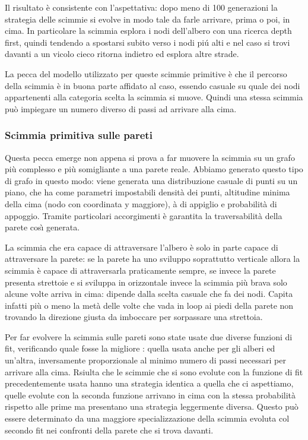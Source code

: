 \documentclass{article}
\begin{document}
Il risultato \`{e} consistente con l'aspettativa: dopo meno di 100 generazioni la strategia delle scimmie si evolve in modo tale da farle arrivare, prima o poi, in cima. In particolare la scimmia esplora i nodi dell'albero con una ricerca depth first, quindi tendendo a spostarsi subito verso i nodi pi\'{u} alti e nel caso si trovi davanti a un vicolo cieco ritorna indietro ed esplora altre strade.

La pecca del modello utilizzato per queste scimmie primitive \`{e} che il percorso della scimmia \`{e} in buona parte affidato al caso, essendo casuale su quale dei nodi appartenenti alla categoria scelta la scimmia si muove. Quindi una stessa scimmia pu\`{o} impiegare un numero diverso di passi ad arrivare alla cima.
\subsubsection{Scimmia primitiva sulle pareti}
Questa pecca emerge non appena si prova a far muovere la scimmia su un grafo pi\`{u} complesso e pi\`{u} somigliante a una parete reale. Abbiamo generato questo tipo di grafo in questo modo: viene generata una distribuzione casuale di punti su un piano, che ha come parametri impostabili densit\`{a} dei punti, altitudine minima della cima (nodo con coordinata y maggiore), \`{a} di appiglio e probabilit\`{a} di appoggio. Tramite particolari accorgimenti \`{e} garantita la traversabilit\`{a} della parete cos\`{\i} generata. 

La scimmia che era capace di attraversare l'albero \`{e} solo in parte capace di attraversare la parete: se la parete ha uno sviluppo soprattutto verticale allora la scimmia \`{e} capace di attraversarla praticamente sempre, se invece la parete presenta strettoie e si sviluppa in orizzontale invece la scimmia pi\`{u} brava solo alcune volte arriva in cima: dipende dalla scelta casuale che fa dei nodi. Capita infatti pi\`{u} o meno la met\`{a} delle volte che vada in loop ai piedi della parete non trovando la direzione giusta da imboccare per sorpassare una strettoia.

Per far evolvere la scimmia sulle pareti sono state usate due diverse funzioni di fit, verificando quale fosse la migliore : quella usata anche per gli alberi ed un'altra, inversamente proporzionale al minimo numero di passi necessari per arrivare alla cima. Rsiulta che le scimmie che si sono evolute con la funzione di fit precedentemente usata hanno una strategia identica a quella che ci aspettiamo, quelle evolute con la seconda funzione arrivano in cima con la stessa probabilit\`{a} rispetto alle prime ma presentano una strategia leggermente diversa. Questo pu\`{o} essere determinato da una maggiore specializzazione della scimmia evoluta col secondo fit nei confronti della parete che si trova davanti.
\end{document}
